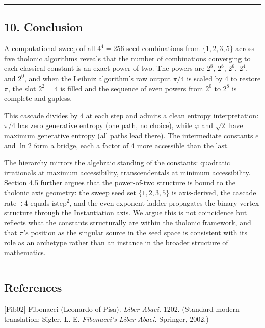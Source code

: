 \documentclass[
  11pt,
  letterpaper,
]{article}
\begin{document}
\begin{center}\rule{0.5\linewidth}{0.5pt}\end{center}

\subsection{10. Conclusion}\label{conclusion}

A computational sweep of all \(4^4 = 256\) seed combinations from
\(\{1, 2, 3, 5\}\) across five tholonic algorithms reveals that the
number of combinations converging to each classical constant is an exact
power of two. The powers are \(2^8\), \(2^8\), \(2^6\), \(2^4\), and
\(2^0\), and when the Leibniz algorithm's raw output \(\pi/4\) is scaled
by 4 to restore \(\pi\), the slot \(2^2 = 4\) is filled and the sequence
of even powers from \(2^0\) to \(2^8\) is complete and gapless.

This cascade divides by 4 at each step and admits a clean entropy
interpretation: \(\pi/4\) has zero generative entropy (one path, no
choice), while \(\varphi\) and \(\sqrt{2}\) have maximum generative
entropy (all paths lead there). The intermediate constants \(e\) and
\(\ln 2\) form a bridge, each a factor of 4 more accessible than the
last.

The hierarchy mirrors the algebraic standing of the constants: quadratic
irrationals at maximum accessibility, transcendentals at minimum
accessibility. Section 4.5 further argues that the power-of-two
structure is bound to the tholonic axis geometry: the sweep seed set
\(\{1, 2, 3, 5\}\) is axis-derived, the cascade rate \(\div 4\) equals
\(\mathrm{istep}^2\), and the even-exponent ladder propagates the binary
vertex structure through the Instantiation axis. We argue this is not
coincidence but reflects what the constants structurally are within the
tholonic framework, and that \(\pi\)'s position as the singular source
in the seed space is consistent with its role as an archetype rather
than an instance in the broader structure of mathematics.

\begin{center}\rule{0.5\linewidth}{0.5pt}\end{center}

\subsection{References}\label{references}

{[}Fib02{]} Fibonacci (Leonardo of Pisa). \emph{Liber Abaci.} 1202.
(Standard modern translation: Sigler, L. E. \emph{Fibonacci's Liber
Abaci.} Springer, 2002.)
\end{document}

